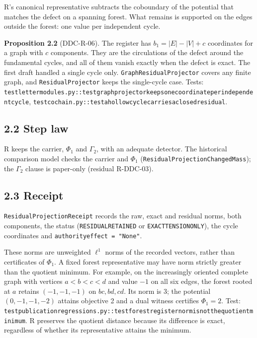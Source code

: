 \documentclass[
  11pt,
]{article}
\renewcommand{\_}{\ddcunderscore\allowbreak}
\begin{document}
R's canonical representative subtracts the coboundary of the potential
that matches the defect on a spanning forest. What remains is supported
on the edges outside the forest: one value per independent cycle.

\textbf{Proposition 2.2} (DDC-R-06). The register has
\(b_1 = |E| - |V| + c\) coordinates for a graph with \(c\) components.
They are the circulations of the defect around the fundamental cycles,
and all of them vanish exactly when the defect is exact. The first draft
handled a single cycle only. \texttt{Graph\allowbreak Residual\allowbreak Projector} covers any
finite graph, and \texttt{Residual\allowbreak Projector} keeps the single-cycle
case. Tests:
\texttt{test\_letter\_modules.\allowbreak py::test\_graph\_projector\_keeps\_one\_coordinate\_per\_independent\_cycle},
\texttt{test\_cochain.\allowbreak py::test\_a\_hollow\_cycle\_carries\_a\_closed\_residual}.

\subsection{2.2 Step law}\label{step-law-1}

R keeps the carrier, \(\Phi_1\) and \(\Gamma_2\), with an adequate
detector. The historical comparison model checks the carrier and
\(\Phi_1\) (\texttt{Residual\allowbreak Projection\allowbreak Changed\allowbreak Mass}); the \(\Gamma_2\)
clause is paper-only (residual R-DDC-03).

\subsection{2.3 Receipt}\label{receipt-1}

\texttt{Residual\allowbreak Projection\allowbreak Receipt} records the raw, exact and residual
norms, both components, the status (\texttt{RESIDUAL\_RETAINED} or
\texttt{EXACT\_TENSION\_ONLY}), the cycle coordinates and
\texttt{authority\_effect\ =\ "None"}.

These norms are unweighted \(\ell^1\) norms of the recorded vectors,
rather than certificates of \(\Phi_1\). A fixed forest representative
may have norm strictly greater than the quotient minimum. For example,
on the increasingly oriented complete graph with vertices \(a<b<c<d\)
and value \(-1\) on all six edges, the forest rooted at \(a\) retains
\((-1,-1,-1)\) on \(bc,bd,cd\). Its norm is 3; the potential
\((0,-1,-1,-2)\) attains objective 2 and a dual witness certifies
\(\Phi_1=2\). Test:
\texttt{test\_publication\_regressions.\allowbreak py::test\_forest\_register\_norm\_is\_not\_the\_quotient\_minimum}.
R preserves the quotient distance because its difference is exact,
regardless of whether its representative attains the minimum.
\end{document}
